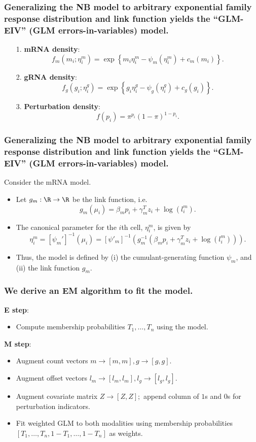 \documentclass{beamer}
\begin{document}
\begin{frame}
\frametitle{Generalizing the NB model to arbitrary exponential family response distribution and link function yields the ``GLM-EIV'' (GLM errors-in-variables) model.}

\begin{itemize}
\item[1.] \textbf{mRNA density}: $$f_m(m_i; \eta^m_i) = \exp\left\{m_i \eta_i^m - \psi_m(\eta_i^m) + c_m(m_i) \right\}.$$
\item[2.] \textbf{gRNA density}: $$f_g(g_i; \eta^g_i) = \exp\left\{ g_i \eta_i^g - \psi_g(\eta_i^g) + c_g(g_i) \right\}.$$
\item[3.] \textbf{Perturbation density}: $$ f(p_i) = \pi^{p_i} (1-\pi)^{1-p_i}.$$
\end{itemize}
\end{frame}

\begin{frame}
\frametitle{Generalizing the NB model to arbitrary exponential family response distribution and link function yields the ``GLM-EIV'' (GLM errors-in-variables) model.}

Consider the mRNA model.
\begin{itemize}
\item Let $g_m : \R \to \R$ be the link function, i.e.
$$g_m(\mu_i) = \beta_m p_i + \gamma^T_m z_i + \log(l_i^m).$$
\item The canonical parameter for the $i$th cell, $\eta^m_i$, is given by
$$ \eta_i^m = \left[ \psi_m' \right]^{-1} \left( \mu_i \right) = \left[ \psi'_m \right]^{-1} \left( g_m^{-1} \left( \beta_m p_i + \gamma_m^T z_i + \log(l_i^m) \right)\right).$$
\item Thus, the model is defined by (i) the cumulant-generating function $\psi_m$, and (ii) the link function $g_m$. 
\end{itemize}
\end{frame}

\begin{frame}
\frametitle{We derive an EM algorithm to fit the model.}
\textbf{E step}:
\begin{itemize}
\item Compute membership probabilities $T_1, \dots, T_n$ using the model.
\end{itemize}

\textbf{M step}:
\begin{itemize}
\item Augment count vectors $m \rightarrow [m, m], g \rightarrow [g, g]$.
\item Augment offset vectors $l_m \rightarrow [l_m, l_m], l_g \rightarrow [l_g, l_g]$.
\item Augment covariate matrix  $Z \rightarrow [Z, Z];$ append column of $1$s and $0$s for perturbation indicators.
\item Fit weighted GLM to both modalities using membership probabilities $[T_1, \dots, T_n, 1 - T_1, \dots, 1 - T_n]$ as weights.
\end{itemize}
\end{frame}
\end{document}
